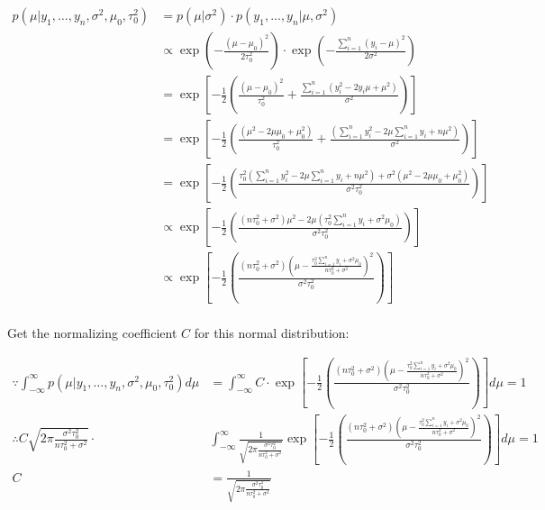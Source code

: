 \documentclass[11pt]{article}
\begin{document}
\begin{align*}
p(\mu|y_1,\ldots,y_n, \sigma^2, \mu_0, \tau_0^2) 
&= p(\mu|\sigma^2)\cdot p(y_1,\ldots,y_n|\mu,\sigma^2)\\
&\propto \exp\left( -\frac{\left( \mu-\mu_0 \right)^2 }{2\tau_0^2} \right)\cdot \exp\left( -\frac{\sum_{i=1}^{n} \left(y_i-\mu \right) ^2}{2\sigma^2} \right) \\
&= \exp\left[ -\frac{1}{2}\left( \frac{\left( \mu-\mu_0 \right)^2 }{\tau_0^2} + \frac{\sum_{i=1}^{n} \left(y_i^2-2y_i\mu+\mu^2 \right) }{\sigma^2} \right)\right] \\
&= \exp\left[ -\frac{1}{2}\left( \frac{\left( \mu^2-2\mu\mu_0+\mu_0^2 \right) }{\tau_0^2} + \frac{\left(\sum_{i=1}^{n} y_i^2-2\mu\sum_{i=1}^{n} y_i+n\mu^2 \right) }{\sigma^2} \right)\right] \\
&= \exp\left[ -\frac{1}{2}\left( \frac{\tau_0^2 \left(\sum_{i=1}^{n} y_i^2-2\mu\sum_{i=1}^{n} y_i+n\mu^2 \right)+ \sigma^2 \left( \mu^2-2\mu\mu_0+\mu_0^2 \right)}{\sigma^2\tau_0^2} \right)\right] \\
&\propto \exp\left[ -\frac{1}{2}\left( \frac{(n\tau_0^2+\sigma^2)\mu^2 - 2\mu\left( \tau_0^2 \sum_{i=1}^{n} y_i + \sigma^2\mu_0 \right) }{\sigma^2\tau_0^2} \right)\right] \\
&\propto \exp\left[ -\frac{1}{2}\left( \frac{(n\tau_0^2+\sigma^2)(\mu-\frac{ \tau_0^2 \sum_{i=1}^{n} y_i + \sigma^2\mu_0 }{n\tau_0^2+\sigma^2})^2 }{\sigma^2\tau_0^2} \right)\right] \\
\end{align*}

Get the normalizing coefficient $C$ for this normal distribution:

\begin{align*}
\because \int_{-\infty}^{\infty}p(\mu|y_1,\ldots,y_n, \sigma^2, \mu_0, \tau_0^2) d \mu &= \int_{-\infty}^{\infty}C\cdot \exp\left[ -\frac{1}{2}\left( \frac{(n\tau_0^2+\sigma^2)(\mu-\frac{ \tau_0^2 \sum_{i=1}^{n} y_i + \sigma^2\mu_0 }{n\tau_0^2+\sigma^2})^2 }{\sigma^2\tau_0^2} \right)\right] d \mu = 1 \\
\therefore C \sqrt{2\pi \frac{\sigma^2\tau_0^2}{n\tau_0^2+\sigma^2}}\cdot &\int_{-\infty}^{\infty} \frac{1}{\sqrt{2\pi \frac{\sigma^2\tau_0^2}{n\tau_0^2+\sigma^2}} }\exp\left[ -\frac{1}{2}\left( \frac{(n\tau_0^2+\sigma^2)(\mu-\frac{ \tau_0^2 \sum_{i=1}^{n} y_i + \sigma^2\mu_0 }{n\tau_0^2+\sigma^2})^2 }{\sigma^2\tau_0^2} \right)\right] d \mu = 1\\
									      C&=\frac{1}{\sqrt{2\pi \frac{\sigma^2\tau_0^2}{n\tau_0^2+\sigma^2}} }
\end{align*}
\end{document}
